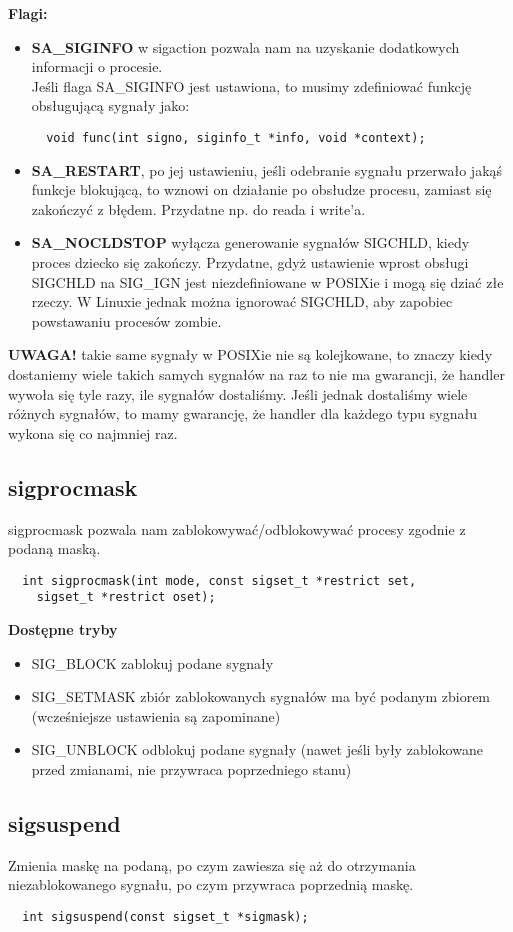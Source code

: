 \documentclass[12pt, a4paper, polish, openany]{book}
\begin{document}
\textbf{Flagi:}
\begin{itemize}
  \item \textbf{SA\_SIGINFO} w sigaction pozwala nam na uzyskanie dodatkowych informacji o procesie.\\
  Jeśli flaga SA\_SIGINFO jest ustawiona, to musimy zdefiniować funkcję obsługującą sygnały jako:
  \begin{verbatim}
  void func(int signo, siginfo_t *info, void *context);
  \end{verbatim}
  \item \textbf{SA\_RESTART}, po jej ustawieniu, jeśli odebranie sygnału przerwało jakąś funkcje blokującą, to wznowi on działanie po obsłudze procesu, zamiast się zakończyć z błędem. Przydatne np. do reada i write'a.
  \item \textbf{SA\_NOCLDSTOP} wyłącza generowanie sygnałów SIGCHLD, kiedy proces dziecko się zakończy. Przydatne, gdyż ustawienie wprost obsługi SIGCHLD na SIG\_IGN jest niezdefiniowane w POSIXie i mogą się dziać złe rzeczy. W Linuxie jednak można ignorować SIGCHLD, aby zapobiec powstawaniu procesów zombie.
\end{itemize}
\textbf{UWAGA!} takie same sygnały w POSIXie nie są kolejkowane, to znaczy kiedy dostaniemy wiele takich samych sygnałów na raz to nie ma gwarancji, że handler wywoła się tyle razy, ile sygnałów dostaliśmy. Jeśli jednak dostaliśmy wiele różnych sygnałów, to mamy gwarancję, że handler dla każdego typu sygnału wykona się co najmniej raz.
\subsection{sigprocmask}
sigprocmask pozwala nam zablokowywać/odblokowywać procesy zgodnie z podaną maską.
\begin{verbatim}
  int sigprocmask(int mode, const sigset_t *restrict set,
    sigset_t *restrict oset);
\end{verbatim}
\textbf{Dostępne tryby}
\begin{itemize}
  \item SIG\_BLOCK zablokuj podane sygnały
  \item SIG\_SETMASK zbiór zablokowanych sygnałów ma być podanym zbiorem (wcześniejsze ustawienia są zapominane)
  \item SIG\_UNBLOCK odblokuj podane sygnały (nawet jeśli były zablokowane przed zmianami, nie przywraca poprzedniego stanu)
\end{itemize}
\subsection{sigsuspend}
Zmienia maskę na podaną, po czym zawiesza się aż do otrzymania niezablokowanego sygnału, po czym przywraca poprzednią maskę.
\begin{verbatim}
  int sigsuspend(const sigset_t *sigmask);
\end{verbatim}
\end{document}
